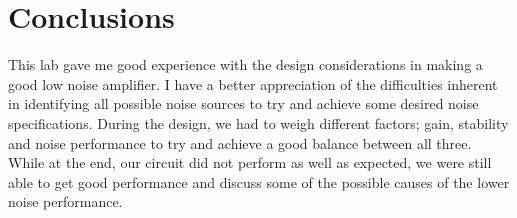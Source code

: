 \documentclass[twocolumn, aps, floatfix]{revtex4-1}
\begin{document}
\section*{Conclusions}

This lab gave me good experience with the design considerations in making a good low noise amplifier. I have a better appreciation of the difficulties inherent in identifying all possible noise sources to try and achieve some desired noise specifications. During the design, we had to weigh different factors; gain, stability and noise performance to try and achieve a good balance between all three. While at the end, our circuit did not perform as well as expected, we were still able to get good performance and discuss some of the possible causes of the lower noise performance.
\end{document}
